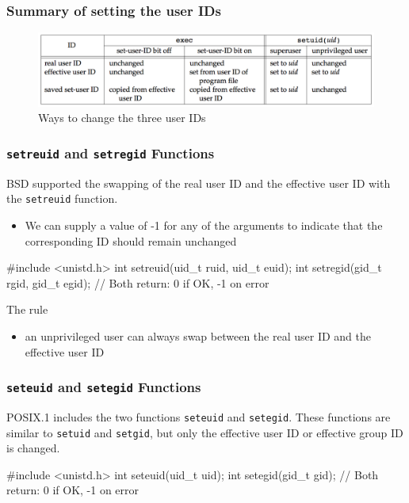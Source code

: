 \documentclass[newPxFont,sthlmFooter,nooffset]{beamer}
\begin{document}
\begin{frame}[t]
  \frametitle{Summary of setting the user IDs}
  \begin{figure}[h]
    \centering
    \includegraphics[width=\linewidth]{figure/fig8-18_ways.png}
    \caption{Ways to change the three user IDs}
    \label{fig:ways}
  \end{figure}
\end{frame}


\begin{frame}[containsverbatim,t]
  \frametitle{\texttt{setreuid} and \texttt{setregid} Functions}
BSD supported the swapping of the real user ID and the effective user ID
with the \texttt{setreuid} function.
\begin{itemize}
\item We can supply a value of -1 for any of the arguments to indicate that the corresponding ID should remain unchanged
\end{itemize}
\begin{codedef}
#include <unistd.h>
int setreuid(uid_t ruid, uid_t euid);
int setregid(gid_t rgid, gid_t egid);
// Both return: 0 if OK, -1 on error
\end{codedef}

The rule
\begin{itemize}
\item an unprivileged user can always swap between the real user ID and the effective user ID
\end{itemize}
\end{frame}


\begin{frame}[containsverbatim,t]
  \frametitle{\texttt{seteuid} and \texttt{setegid} Functions}
POSIX.1 includes the two functions \texttt{seteuid} and \texttt{setegid}. These functions are similar to \texttt{setuid} and \texttt{setgid}, but only the effective user ID or effective group ID is changed.
\begin{codedef}
#include <unistd.h>
int seteuid(uid_t uid);
int setegid(gid_t gid);
// Both return: 0 if OK, -1 on error
\end{codedef}
\end{frame}
\end{document}
